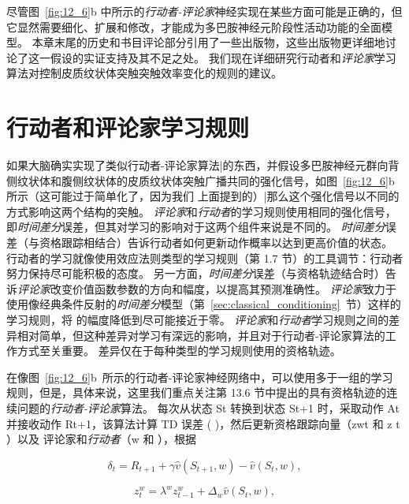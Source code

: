尽管图~\ref{fig:12_6}b 中所示的\textit{行动者-评论家}神经实现在某些方面可能是正确的，但它显然需要细化、扩展和修改，才能成为多巴胺神经元阶段性活动功能的全面模型。
本章末尾的历史和书目评论部分引用了一些出版物，这些出版物更详细地讨论了这一假设的实证支持及其不足之处。
我们现在详细研究行动者和\textit{评论家}学习算法对控制皮质纹状体突触突触效率变化的规则的建议。





\section{行动者和评论家学习规则} \label{sec:ac_rules}

如果大脑确实实现了类似行动者-评论家算法|的东西，并假设多巴胺神经元群向背侧纹状体和腹侧纹状体的皮质纹状体突触广播共同的强化信号，如图~\ref{fig:12_6}b 所示（这可能过于简单化了，因为我们 上面提到的）|那么这个强化信号以不同的方式影响这两个结构的突触。
\textit{评论家}和\textit{行动者}的学习规则使用相同的强化信号，即\textit{时间差分}误差，但其对学习的影响对于这两个组件来说是不同的。
\textit{时间差分}误差（与资格跟踪相结合）告诉行动者如何更新动作概率以达到更高价值的状态。
行动者的学习就像使用效应法则类型的学习规则（第 1.7 节）的工具调节：行动者努力保持尽可能积极的态度。
另一方面，\textit{时间差分}误差（与资格轨迹结合时）告诉\textit{评论家}改变价值函数参数的方向和幅度，以提高其预测准确性。
\textit{评论家}致力于使用像经典条件反射的\textit{时间差分}模型（第~\ref{sec:classical_conditioning}~节）这样的学习规则，将 的幅度降低到尽可能接近于零。
\textit{评论家}和\textit{行动者}学习规则之间的差异相对简单，但这种差异对学习有深远的影响，并且对于行动者-评论家算法的工作方式至关重要。
差异仅在于每种类型的学习规则使用的资格轨迹。


在像图~\ref{fig:12_6}b~所示的行动者-评论家神经网络中，可以使用多于一组的学习规则，但是，具体来说，这里我们重点关注第 13.6 节中提出的具有资格轨迹的连续问题的\textit{行动者-评论家}算法。
每次从状态 St 转换到状态 St+1 时，采取动作 At 并接收动作 Rt+1，该算法计算 TD 误差 ( )，然后更新资格跟踪向量（zwt 和 z t ）以及 评论家和\textit{行动者}（w 和 ），根据

\begin{equation}
	\delta_t = R_{t+1}
		+ \gamma \hat{v} (S_{t+1}, w)
		- \hat{v} (S_t, w),
\end{equation}


\begin{equation}
	z_t ^w = \lambda^w z_{t-1}^w
		+ \Delta_w \hat{v} (S_t, w),
\end{equation}

